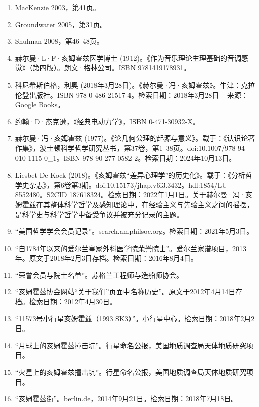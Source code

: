 \begin{enumerate}
\item MacKenzie 2003，第41页。
\item Groundwater 2005，第31页。
\item Shulman 2008，第46–48页。
\item 赫尔曼·L·F·亥姆霍兹医学博士 (1912)。《作为音乐理论生理基础的音调感觉》（第四版）。朗文·格林公司。ISBN 9781419178931。
\item 科尼希斯伯格，利奥 (2018年3月28日)。《赫尔曼·冯·亥姆霍兹》。牛津：克拉伦登出版社。ISBN 978-0-486-21517-4。检索日期：2018年3月28日 – 来源：Google Books。
\item 约翰·D·杰克逊，《经典电动力学》，ISBN 0-471-30932-X。
\item 赫尔曼·冯·亥姆霍兹 (1977)。《论几何公理的起源与意义》。载于：《认识论著作集》，波士顿科学哲学研究丛书，第37卷，第1–38页。doi:10.1007/978-94-010-1115-0\_1。ISBN 978-90-277-0582-2。检索日期：2024年10月13日。
\item Liesbet De Kock (2018)。《亥姆霍兹“差异心理学”的历史化》。载于：《分析哲学史杂志》，第6卷第3期。doi:10.15173/jhap.v6i3.3432。hdl:1854/LU-8552480。S2CID 187618324。检索日期：2022年1月1日。关于赫尔曼·冯·亥姆霍兹在其整体科学哲学及感知理论中，在经验主义与先验主义之间的摇摆，是科学史与科学哲学中备受争议并被充分记录的主题。
\item “美国哲学学会会员记录”。search.amphilsoc.org。检索日期：2021年5月3日。
\item “自1784年以来的爱尔兰皇家外科医学院荣誉院士”。爱尔兰家谱项目，2013年。原文于2018年2月3日存档。检索日期：2016年8月4日。
\item “荣誉会员与院士名单”。苏格兰工程师与造船师协会。
\item “亥姆霍兹协会网站“关于我们”页面中名称历史”。原文于2012年4月14日存档。检索日期：2012年4月30日。
\item “11573号小行星亥姆霍兹（1993 SK3）”。小行星中心。检索日期：2018年2月2日。
\item “月球上的亥姆霍兹撞击坑”。行星命名公报，美国地质调查局天体地质研究项目。
\item “火星上的亥姆霍兹撞击坑”。行星命名公报，美国地质调查局天体地质研究项目。
\item “亥姆霍兹街”。berlin.de，2014年9月21日。检索日期：2018年7月18日。
\end{enumerate}
